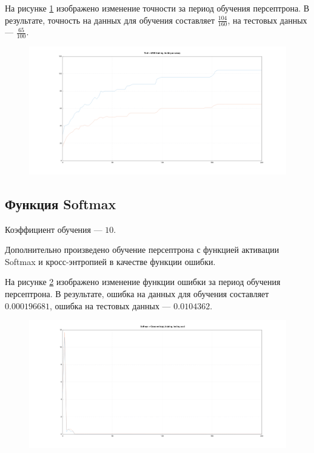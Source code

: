\documentclass[a4paper, 14pt]{extarticle}
\begin{document}
На рисунке \ref{fig:tanh_mse_accuracy} изображено изменение точности за период обучения персептрона.
В результате, точность на данных для обучения составляет $\frac{104}{160}$, на тестовых данных --- $\frac{65}{100}$.

\begin{figure}[!htb]
  \centering\includegraphics[width=\textwidth]{images/tanh_mse_accuracy.png}
  \caption{}
  \label{fig:tanh_mse_accuracy}
\end{figure}

\subsection{Функция Softmax}

Коэффициент обучения --- $10$.

Дополнительно произведено обучение персептрона с функцией активации Softmax и кросс-энтропией в качестве функции ошибки.

На рисунке \ref{fig:softmax_cross_entropy_cost} изображено изменение функции ошибки за период обучения персептрона.
В результате, ошибка на данных для обучения составляет $0.000196681$, ошибка на тестовых данных --- $0.0104362$.

\begin{figure}[!htb]
  \centering\includegraphics[width=\textwidth]{images/softmax_cross_entropy_cost.png}
  \caption{}
  \label{fig:softmax_cross_entropy_cost}
\end{figure}
\end{document}
